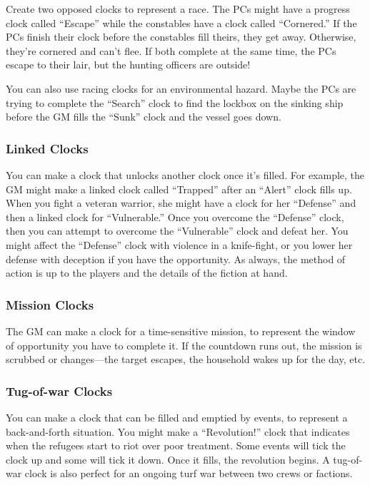 Create two opposed clocks to represent a race. The PCs might have a progress clock called ``Escape'' while the constables have a clock called ``Cornered.'' If the PCs finish their clock before the constables fill theirs, they get away. Otherwise, they’re cornered and can’t flee. If both complete at the same time, the PCs escape to their lair, but the hunting officers are outside!

You can also use racing clocks for an environmental hazard. Maybe the PCs are trying to complete the ``Search'' clock to find the lockbox on the sinking ship before the GM fills the ``Sunk'' clock and the vessel goes down.

\subsubsection{Linked Clocks}

You can make a clock that unlocks another clock once it’s filled. For example, the GM might make a linked clock called ``Trapped'' after an ``Alert'' clock fills up. When you fight a veteran warrior, she might have a clock for her ``Defense'' and then a linked clock for ``Vulnerable.'' Once you overcome the ``Defense'' clock, then you can attempt to overcome the ``Vulnerable'' clock and defeat her. You might affect the ``Defense'' clock with violence in a knife-fight, or you lower her defense with deception if you have the opportunity. As always, the method of action is up to the players and the details of the fiction at hand.

\subsubsection{Mission Clocks}

The GM can make a clock for a time-sensitive mission, to represent the window of opportunity you have to complete it. If the countdown runs out, the mission is scrubbed or changes—the target escapes, the household wakes up for the day, etc.

\subsubsection{Tug-of-war Clocks}

You can make a clock that can be filled and emptied by events, to represent a back-and-forth situation. You might make a ``Revolution!'' clock that indicates when the refugees start to riot over poor treatment. Some events will tick the clock up and some will tick it down. Once it fills, the revolution begins. A tug-of-war clock is also perfect for an ongoing turf war between two crews or factions.


